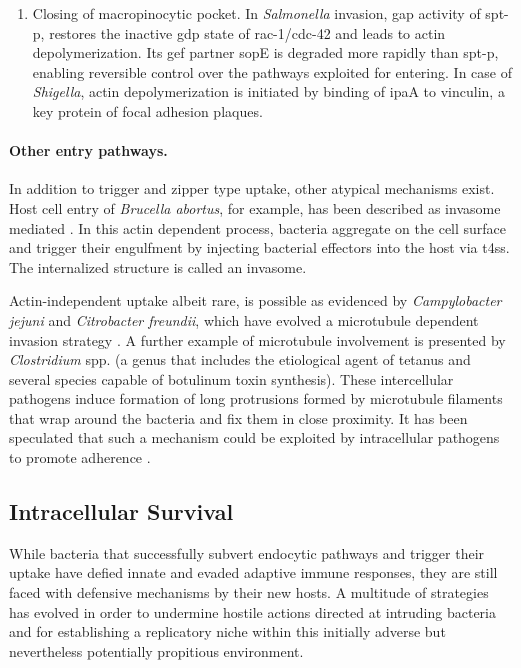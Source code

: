 \begin{enumerate}[label=(\alph*)]
  \item Closing of macropinocytic pocket. In \textit{Salmonella} invasion, \gls{gap} activity of \gls{spt-p}, restores the inactive \gls{gdp} state of \gls{rac-1}\slash \gls{cdc-42} and leads to actin depolymerization. Its \gls{gef} partner \acrshort{sop}E is degraded more rapidly than \gls{spt-p}, enabling reversible control over the pathways exploited for entering. In case of \textit{Shigella}, actin depolymerization is initiated by binding of \acrshort{ipa}A to vinculin, a key protein of focal adhesion plaques.
\end{enumerate}

\paragraph{Other entry pathways.}
In addition to trigger and zipper type uptake, other atypical mechanisms exist. Host cell entry of \textit{Brucella abortus}, for example, has been described as invasome mediated \citep{Dehio2005}. In this actin dependent process, bacteria aggregate on the cell surface and trigger their engulfment by injecting bacterial effectors into the host via \gls{t4ss}. The internalized structure is called an invasome.

Actin-independent uptake albeit rare, is possible as evidenced by \textit{Campylobacter jejuni} and \textit{Citrobacter freundii}, which have evolved a microtubule dependent invasion strategy \citep{Kopecko2001}. A further example of microtubule involvement is presented by \textit{Clostridium} spp. (a genus that includes the etiological agent of tetanus and several species capable of botulinum toxin synthesis). These intercellular pathogens induce formation of long protrusions formed by microtubule filaments that wrap around the bacteria and fix them in close proximity. It has been speculated that such a mechanism could be exploited by intracellular pathogens to promote adherence \citep{Haglund2011}.

\subsection{Intracellular Survival}
While bacteria that successfully subvert endocytic pathways and trigger their uptake have defied innate and evaded adaptive immune responses, they are still faced with defensive mechanisms by their new hosts. A multitude of strategies has evolved in order to undermine hostile actions directed at intruding bacteria and for establishing a replicatory niche within this initially adverse but nevertheless potentially propitious environment.

